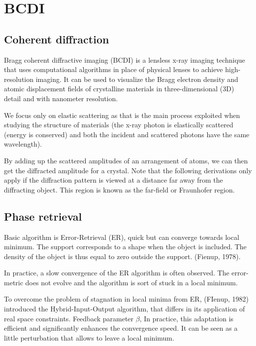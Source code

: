 \section{BCDI}

\subsection{Coherent diffraction}

Bragg coherent diffractive imaging (BCDI) is a lensless x-ray imaging technique that uses computational algorithms in place of physical lenses to achieve high-resolution imaging. It can be used to visualize the Bragg electron density and atomic displacement fields of crystalline materials in three-dimensional (3D) detail and with nanometer resolution.

We focus only on elastic scattering as that is the main process exploited when studying the structure of materials (the x-ray photon is elastically scattered (energy is conserved) and both the incident and scattered photons have the same wavelength).

By adding up the scattered amplitudes of an arrangement of atoms, we can then get the diffracted amplitude for a crystal. Note that the following derivations only apply if the diffraction pattern is viewed at a distance far away from the diffracting object. This region is known as the far-field or Fraunhofer region.

\subsection{Phase retrieval}

Basic algorithm is Error-Retrieval (ER), quick but can converge towards local minimum. 
The support corresponds to a shape when the object is included. The density of the object is thus equal to zero outside the support. (Fienup, 1978).

In practice, a slow convergence of the ER algorithm is often observed. The error-metric does not evolve and the algorithm is sort of stuck in a local minimum.

To overcome the problem of stagnation in local minima from ER, (FIenup, 1982) introduced the Hybrid-Input-Output algorithm, that differs in its application of real space constraints. Feedback parameter $\beta$, 
In practice, this adaptation is efficient and significantly enhances the convergence speed. It can be seen as a little perturbation that allows to leave a local minimum.


